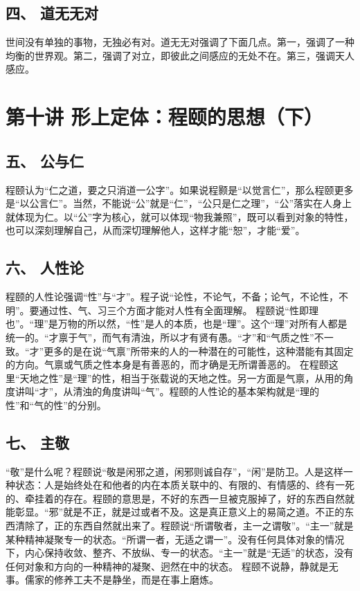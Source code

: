 \documentclass{article}
\begin{document}
\subsection{四、	道无无对}
世间没有单独的事物，无独必有对。道无无对强调了下面几点。第一，强调了一种均衡的世界观。第二，强调了对立，即彼此之间感应的无处不在。第三，强调天人感应。

\section{第十讲 形上定体：程颐的思想（下）}
\subsection{五、	公与仁}
程颐认为“仁之道，要之只消道一公字”。如果说程颢是“以觉言仁”，那么程颐更多是“以公言仁”。当然，不能说“公”就是“仁”，“公只是仁之理”，“公”落实在人身上就体现为仁。以“公”字为核心，就可以体现“物我兼照”，既可以看到对象的特性，也可以深刻理解自己，从而深切理解他人，这样才能“恕”，才能“爱”。
\subsection{六、	人性论}
程颐的人性论强调“性”与“才”。程子说“论性，不论气，不备；论气，不论性，不明”。要通过性、气、习三个方面才能对人性有全面理解。
程颐说“性即理也”。“理”是万物的所以然，“性”是人的本质，也是“理”。这个“理”对所有人都是统一的。“才禀于气”，而气有清浊，所以才有贤有愚。“才”和“气质之性”不一致。“才”更多的是在说“气禀”所带来的人的一种潜在的可能性，这种潜能有其固定的方向。气禀或气质之性本身是有善恶的，而才确是无所谓善恶的。
在程颐这里“天地之性”是“理”的性，相当于张载说的天地之性。另一方面是气禀，从用的角度讲叫“才”，从清浊的角度讲叫“气”。程颐的人性论的基本架构就是“理的性”和“气的性”的分别。
\subsection{七、	主敬}
“敬”是什么呢？程颐说“敬是闲邪之道，闲邪则诚自存”，“闲”是防卫。人是这样一种状态：人是始终处在和他者的内在本质关联中的、有限的、有情感的、终有一死的、牵挂着的存在。程颐的意思是，不好的东西一旦被克服掉了，好的东西自然就能彰显。“邪”就是不正，就是过或者不及。这是真正意义上的易简之道。不正的东西清除了，正的东西自然就出来了。程颐说“所谓敬者，主一之谓敬”。“主一”就是某种精神凝聚专一的状态。“所谓一者，无适之谓一”。没有任何具体对象的情况下，内心保持收敛、整齐、不放纵、专一的状态。“主一”就是“无适”的状态，没有任何对象和方向的一种精神的凝聚、迥然在中的状态。
程颐不说静，静就是无事。儒家的修养工夫不是静坐，而是在事上磨炼。
\end{document}
